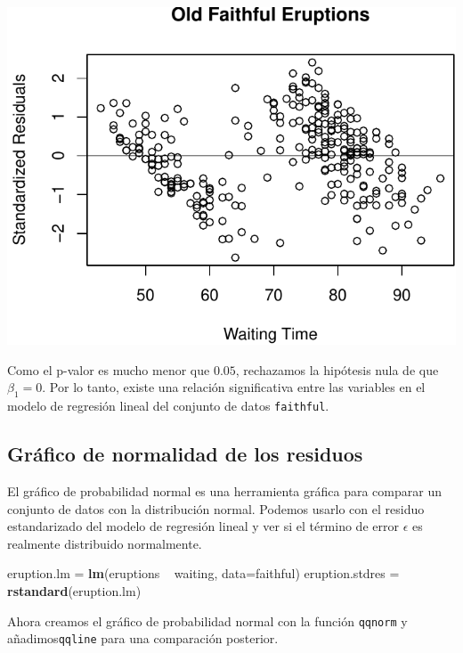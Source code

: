 \documentclass[]{article}
\newenvironment{Shaded}{\begin{snugshade}}{\end{snugshade}}
\newcommand{\KeywordTok}[1]{\textcolor[rgb]{0.13,0.29,0.53}{\textbf{{#1}}}}
\newcommand{\DataTypeTok}[1]{\textcolor[rgb]{0.13,0.29,0.53}{{#1}}}
\newcommand{\StringTok}[1]{\textcolor[rgb]{0.31,0.60,0.02}{{#1}}}
\newcommand{\NormalTok}[1]{{#1}}
\numberwithin{equation}{section}
\begin{document}
\includegraphics{tema6_files/figure-latex/unnamed-chunk-26-1.pdf}

Como el p-valor es mucho menor que \(0.05\), rechazamos la hipótesis
nula de que \(\beta_1 = 0\). Por lo tanto, existe una relación
significativa entre las variables en el modelo de regresión lineal del
conjunto de datos \texttt{faithful}.

\subsection{Gráfico de normalidad de los
residuos}\label{grafico-de-normalidad-de-los-residuos}

El gráfico de probabilidad normal es una herramienta gráfica para
comparar un conjunto de datos con la distribución normal. Podemos usarlo
con el residuo estandarizado del modelo de regresión lineal y ver si el
término de error \(\epsilon\) es realmente distribuido normalmente.

\begin{Shaded}
\begin{Highlighting}[]
\NormalTok{eruption.lm =}\StringTok{ }\KeywordTok{lm}\NormalTok{(eruptions ~}\StringTok{ }\NormalTok{waiting, }\DataTypeTok{data=}\NormalTok{faithful) }
\NormalTok{eruption.stdres =}\StringTok{ }\KeywordTok{rstandard}\NormalTok{(eruption.lm) }
\end{Highlighting}
\end{Shaded}

Ahora creamos el gráfico de probabilidad normal con la función
\texttt{qqnorm} y añadimos\texttt{qqline} para una comparación
posterior.
\end{document}

